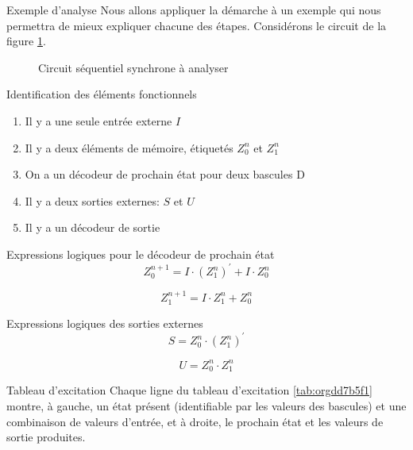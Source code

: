 \documentclass[presentation]{beamer}
\begin{document}
\begin{frame}[label={sec:org62c4e18}]{Exemple d'analyse}
Nous allons appliquer la démarche à un exemple qui nous permettra de
mieux expliquer chacune des étapes. Considérons le circuit de la
figure \ref{fig:org540b8d7}.

\begin{figure}[htbp]
\centering

\caption{\label{fig:org540b8d7}Circuit séquentiel synchrone à analyser}
\end{figure}
\end{frame}


\begin{frame}[label={sec:org99fdb1b}]{Identification des éléments fonctionnels}
\begin{enumerate}
\item Il y a une seule entrée externe \(I\)
\item Il y a deux éléments de mémoire, étiquetés \(Z_0^n\) et  \(Z_1^n\)
\item On a un décodeur de prochain état pour deux bascules D
\item Il y a deux sorties externes: \(S\) et \(U\)
\item Il y a un décodeur de sortie
\end{enumerate}
\end{frame}

\begin{frame}[label={sec:org01b45d8}]{Expressions logiques pour le décodeur de prochain état}
$$ Z_0^{n+1} = I \cdot (Z_1^n)^\prime  + I \cdot Z_0^n $$

$$ Z_1^{n+1} = I \cdot Z_1^n +  Z_0^n  $$
\end{frame}

\begin{frame}[label={sec:org8f0fd8d}]{Expressions logiques des sorties externes}
$$ S =  Z_0^n \cdot (Z_1^{n})^\prime $$

$$ U =  Z_0^n \cdot Z_1^{n} $$
\end{frame}

\begin{frame}[label={sec:org76f8bec}]{Tableau d'excitation}
Chaque ligne du tableau d'excitation \ref{tab:orgdd7b5f1} montre, à gauche,
un état présent (identifiable par les valeurs des bascules) et une
combinaison de valeurs d'entrée, et à droite, le prochain état et les
valeurs de sortie produites.
\end{frame}
\end{document}
